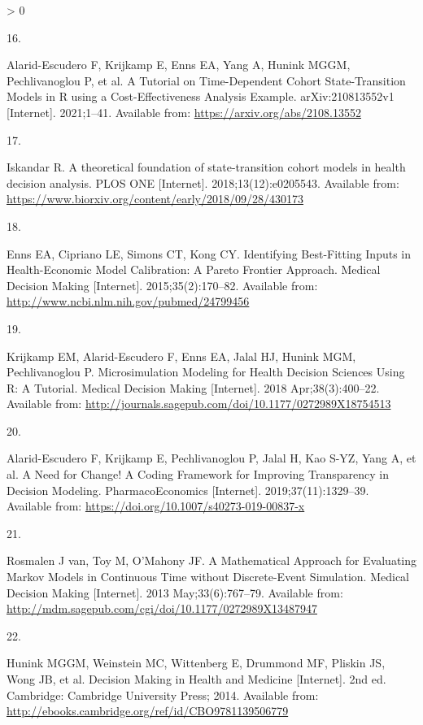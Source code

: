 \documentclass[
]{article}
\newlength{\cslhangindent}
\newlength{\csllabelwidth}
\newenvironment{CSLReferences}[2] %
 {%
  \setlength{\parindent}{0pt}
  \ifodd #1 \everypar{\setlength{\hangindent}{\cslhangindent}}\ignorespaces\fi
  \ifnum #2 > 0
  \setlength{\parskip}{#2\baselineskip}
  \fi
 }%
 {}
\newcommand{\CSLLeftMargin}[1]{\parbox[t]{\csllabelwidth}{#1}}
\newcommand{\CSLRightInline}[1]{\parbox[t]{\linewidth - \csllabelwidth}{#1}\break}
\begin{document}
\begin{CSLReferences}{0}{0}
\leavevmode\hypertarget{ref-Alarid-Escudero2021b}{}%
\CSLLeftMargin{16. }
\CSLRightInline{Alarid-Escudero F, Krijkamp E, Enns EA, Yang A, Hunink MGGM, Pechlivanoglou P, et al. {A Tutorial on Time-Dependent Cohort State-Transition Models in R using a Cost-Effectiveness Analysis Example}. arXiv:210813552v1 {[}Internet{]}. 2021;1--41. Available from: \url{https://arxiv.org/abs/2108.13552}}

\leavevmode\hypertarget{ref-Iskandar2018a}{}%
\CSLLeftMargin{17. }
\CSLRightInline{Iskandar R. {A theoretical foundation of state-transition cohort models in health decision analysis}. PLOS ONE {[}Internet{]}. 2018;13(12):e0205543. Available from: \url{https://www.biorxiv.org/content/early/2018/09/28/430173}}

\leavevmode\hypertarget{ref-Enns2015e}{}%
\CSLLeftMargin{18. }
\CSLRightInline{Enns EA, Cipriano LE, Simons CT, Kong CY. {Identifying Best-Fitting Inputs in Health-Economic Model Calibration: A Pareto Frontier Approach}. Medical Decision Making {[}Internet{]}. 2015;35(2):170--82. Available from: \url{http://www.ncbi.nlm.nih.gov/pubmed/24799456}}

\leavevmode\hypertarget{ref-Krijkamp2018}{}%
\CSLLeftMargin{19. }
\CSLRightInline{Krijkamp EM, Alarid-Escudero F, Enns EA, Jalal HJ, Hunink MGM, Pechlivanoglou P. {Microsimulation Modeling for Health Decision Sciences Using R: A Tutorial}. Medical Decision Making {[}Internet{]}. 2018 Apr;38(3):400--22. Available from: \url{http://journals.sagepub.com/doi/10.1177/0272989X18754513}}

\leavevmode\hypertarget{ref-Alarid-Escudero2019e}{}%
\CSLLeftMargin{20. }
\CSLRightInline{Alarid-Escudero F, Krijkamp E, Pechlivanoglou P, Jalal H, Kao S-YZ, Yang A, et al. {A Need for Change! A Coding Framework for Improving Transparency in Decision Modeling}. PharmacoEconomics {[}Internet{]}. 2019;37(11):1329--39. Available from: \url{https://doi.org/10.1007/s40273-019-00837-x}}

\leavevmode\hypertarget{ref-VanRosmalen2013}{}%
\CSLLeftMargin{21. }
\CSLRightInline{Rosmalen J van, Toy M, O'Mahony JF. {A Mathematical Approach for Evaluating Markov Models in Continuous Time without Discrete-Event Simulation}. Medical Decision Making {[}Internet{]}. 2013 May;33(6):767--79. Available from: \url{http://mdm.sagepub.com/cgi/doi/10.1177/0272989X13487947}}

\leavevmode\hypertarget{ref-Hunink2014}{}%
\CSLLeftMargin{22. }
\CSLRightInline{Hunink MGGM, Weinstein MC, Wittenberg E, Drummond MF, Pliskin JS, Wong JB, et al. {Decision Making in Health and Medicine} {[}Internet{]}. 2nd ed. Cambridge: Cambridge University Press; 2014. Available from: \url{http://ebooks.cambridge.org/ref/id/CBO9781139506779}}


\end{CSLReferences}
\end{document}
